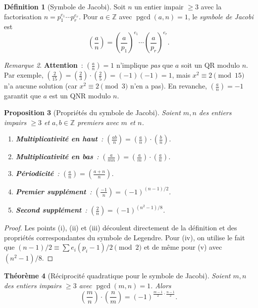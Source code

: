 \documentclass[12pt,a4paper,openany]{book}
\theoremstyle{definition}
\newtheorem{definition}{Définition}[chapter]
\theoremstyle{plain}
\newtheorem{theoreme}[definition]{Théorème}
\newtheorem{proposition}[definition]{Proposition}
\theoremstyle{remark}
\newtheorem{remarque}[definition]{Remarque}
\newcommand{\Z}{\mathbb{Z}}
\newcommand{\legendre}[2]{\left(\frac{#1}{#2}\right)}
\newcommand{\jacobi}[2]{\left(\frac{#1}{#2}\right)}
\DeclareMathOperator{\pgcd}{pgcd}
\begin{document}
\begin{definition}[Symbole de Jacobi]
\label{def:jacobi}
Soit $n$ un entier impair $\geq 3$ avec la factorisation $n = p_1^{e_1} \cdots p_r^{e_r}$.
Pour $a \in \Z$ avec $\pgcd(a, n) = 1$, le \emph{symbole de Jacobi} est
\[
  \jacobi{a}{n} = \legendre{a}{p_1}^{e_1} \cdots \legendre{a}{p_r}^{e_r}.
\]
\end{definition}

\begin{remarque}
\label{rem:jacobi-attention}
\textbf{Attention}~: $\jacobi{a}{n} = 1$ n'implique \emph{pas} que $a$ soit un QR
modulo $n$. Par exemple, $\jacobi{2}{15} = \legendre{2}{3} \cdot \legendre{2}{5}
= (-1)(-1) = 1$, mais $x^2 \equiv 2 \pmod{15}$ n'a aucune solution
(car $x^2 \equiv 2 \pmod{3}$ n'en a pas). En revanche, $\jacobi{a}{n} = -1$
garantit que $a$ est un QNR modulo $n$.
\end{remarque}

\begin{proposition}[Propriétés du symbole de Jacobi]
\label{prop:jacobi-proprietes}
Soient $m, n$ des entiers impairs $\geq 3$ et $a, b \in \Z$ premiers avec $m$ et $n$.
\begin{enumerate}[label=(\roman*)]
  \item \textbf{Multiplicativité en haut}~: $\jacobi{ab}{n} = \jacobi{a}{n} \cdot \jacobi{b}{n}$.
  \item \textbf{Multiplicativité en bas}~: $\jacobi{a}{mn} = \jacobi{a}{m} \cdot \jacobi{a}{n}$.
  \item \textbf{Périodicité}~: $\jacobi{a}{n} = \jacobi{a + n}{n}$.
  \item \textbf{Premier supplément}~: $\jacobi{-1}{n} = (-1)^{(n-1)/2}$.
  \item \textbf{Second supplément}~: $\jacobi{2}{n} = (-1)^{(n^2-1)/8}$.
\end{enumerate}
\end{proposition}

\begin{proof}
Les points (i), (ii) et (iii) découlent directement de la définition et des
propriétés correspondantes du symbole de Legendre. Pour (iv), on utilise le fait que
$(n-1)/2 \equiv \sum e_i (p_i - 1)/2 \pmod{2}$ et de même pour (v) avec $(n^2-1)/8$.
\end{proof}

\begin{theoreme}[Réciprocité quadratique pour le symbole de Jacobi]
\label{thm:jacobi-reciprocite}
Soient $m, n$ des entiers impairs $\geq 3$ avec $\pgcd(m, n) = 1$. Alors
\[
  \jacobi{m}{n} \cdot \jacobi{n}{m} = (-1)^{\frac{m-1}{2} \cdot \frac{n-1}{2}}.
\]
\end{theoreme}
\end{document}
